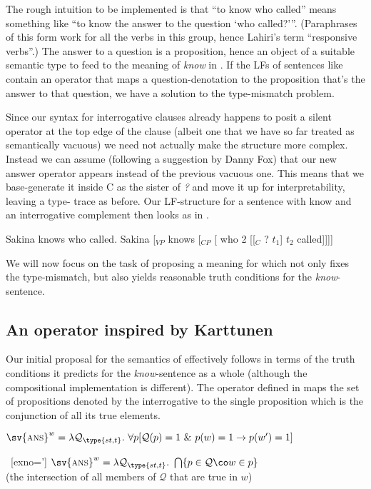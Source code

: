 The rough intuition to be implemented is that ``to know who called'' means
something like ``to know the answer to the question `who called?'''.
(Paraphrases of this form work for all the verbs in this group, hence Lahiri's
term ``responsive verbs''.) The answer to a question is a proposition, hence an
object of a suitable semantic type to feed to the meaning of \emph{know} in
\Last. If the LFs of sentences like  contain an operator that
maps a question-denotation to the proposition that's the answer to that
question, we have a solution to the type-mismatch problem.

Since our syntax for interrogative clauses already happens to posit a silent
operator at the top edge of the clause (albeit one that we have so far treated
as semantically vacuous) we need not actually make the structure more complex.
Instead we can assume (following a suggestion by Danny Fox) that our new answer
operator appears instead of the previous vacuous one. This means that we
base-generate it inside C as the sister of \emph{?} and move it up for
interpretability, leaving a type- trace as before. Our LF-structure
for a sentence with know and an interrogative complement then looks as in
\Next[b].

\pex\label{ex:knows-who}
\a Sakina knows who called.
\a Sakina [$_{VP}$ knows [$_{CP}$  [ who 2 [[$_{C}$ ? $t_{1}$]
$t_{2}$ called]]]]
\xe

We will now focus on the task of proposing a meaning for \ans which not only
fixes the type-mismatch, but also yields reasonable truth conditions for the
\emph{know}-sentence.

\subsection{An \ans operator inspired by Karttunen}
\label{sec:ans-karttunen}

Our initial proposal for the semantics of \ans effectively follows
\cite{karttunen-1977-questions} in terms of the truth conditions it predicts for
the \emph{know}-sentence as a whole (although the compositional implementation
is different). The \ans operator defined in \Next maps the set of propositions
denoted by the interrogative to the single proposition which is the conjunction
of all its true elements.

\ex
$\sv{\ans}^{w} = \lambda \mathcal{Q}_{\type{st,t}}.\ \forall p [\mathcal{Q}(p)=1\ \&\ p(w)=1 \rightarrow p(w')=1]$
\xe

\ex~[exno=\lastx']%
$\sv{\ans}^{w}= \lambda \mathcal{Q}_{\type{st,t}}.\ \bigcap\{p\in \mathcal{Q}\co w\in p\}$\\
\hfill (the intersection of all members of $\mathcal{Q}$ that are true in $w$)
\xe

